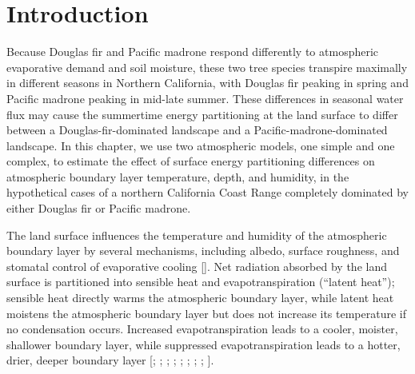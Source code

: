 \section{Introduction}

Because Douglas fir and Pacific madrone respond differently to atmospheric evaporative demand and soil moisture, these two tree species transpire maximally in different seasons in Northern California, with Douglas fir peaking in spring and Pacific madrone peaking in mid-late summer.  These differences in seasonal water flux may cause the summertime energy partitioning at the land surface to differ between a Douglas-fir-dominated landscape and a Pacific-madrone-dominated landscape.  In this chapter, we use two atmospheric models, one simple and one complex, to estimate the effect of surface energy partitioning differences on atmospheric boundary layer temperature, depth, and humidity, in the hypothetical cases of a northern California Coast Range completely dominated by either Douglas fir or Pacific madrone.

The land surface influences the temperature and humidity of the atmospheric boundary layer by several mechanisms, including albedo, surface roughness, and stomatal control of evaporative cooling [\cite{bonan}].  Net radiation absorbed by the land surface is partitioned into sensible heat and evapotranspiration (``latent heat''); sensible heat directly warms the atmospheric boundary layer, while latent heat moistens the atmospheric boundary layer but does not increase its temperature if no condensation occurs.  Increased evapotranspiration leads to a cooler, moister, shallower boundary layer, while suppressed evapotranspiration leads to a hotter, drier, deeper boundary layer [\cite{bonan}; \cite{seneviratne2010investigating}; \cite{de2012modelled}; \cite{fischer2007soil}; \cite{lobell2008effect}; \cite{mueller2012hot}; \cite{durre2000dependence}; \cite{hirschi2010observational}; \cite{Lee:2005kx}].  

